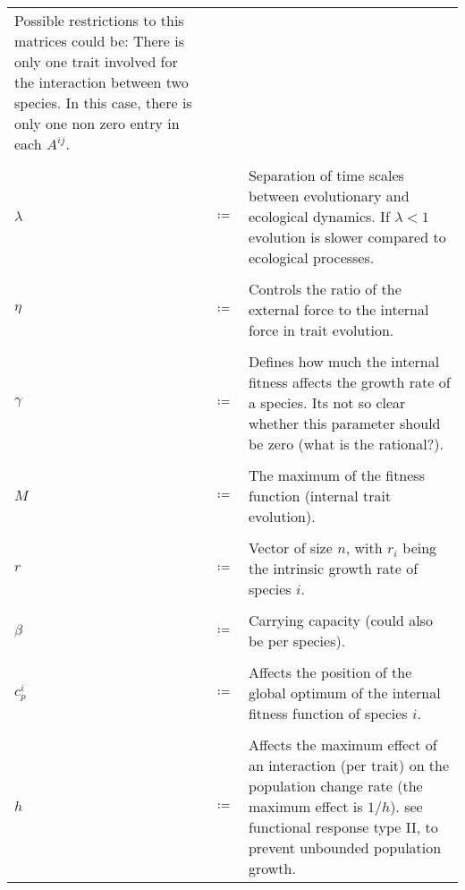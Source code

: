 \documentclass[
12.5pt, 					%
a4paper, 				%
oneside,					%
headinclude,footinclude, %
BCOR5mm, 				%
abstract=on
]{scrreprt}
\numberwithin{equation}{chapter}
\begin{document}
\begin{tabular}{l l p{13cm}}
Possible restrictions to this matrices could be:
There is only one trait involved for the interaction between two species.
In this case, there is only one non zero entry in each $A^{ij}$. \\ \\

 
$\lambda$  & $\coloneqq$ &  Separation of time scales between evolutionary and ecological dynamics.
If $\lambda < 1$ evolution is slower compared to ecological processes.
\\ \\

$\eta$ & $\coloneqq$ & Controls the ratio of the external force to the internal force in trait evolution.
\\ \\

$\gamma$ & $\coloneqq$ & Defines how much the internal fitness affects the growth rate of a species.
Its not so clear whether this parameter should be zero (what is the rational?).\\ \\

$M$ & $\coloneqq$ & The maximum of the fitness function (internal trait evolution). \\ \\

$r$ & $\coloneqq$ & Vector of size $n$, with $r_i$ being the intrinsic growth rate of species $i$.
\\ \\
$\beta$ & $\coloneqq$ & Carrying capacity (could also be per species).
\\ \\
$c^i_p$ & $\coloneqq$ & Affects the position of the global optimum of the internal fitness function of species $i$.
\\ \\
$h$ & $\coloneqq$ & Affects the maximum effect of an interaction (per trait) on the population change rate (the maximum effect is $1/h$). see functional response type II, to prevent unbounded population growth. 


\end{tabular}
\end{document}
